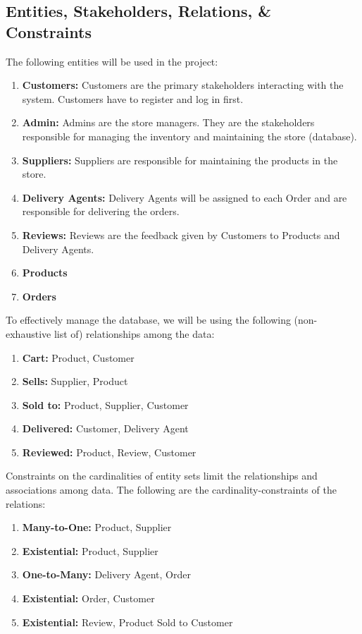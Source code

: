 \documentclass[12pt]{report}
\begin{document}
    \subsection*{Entities, Stakeholders, Relations, \& Constraints}
    The following entities will be used in the project:
    \begin{enumerate}
        \item \textbf{Customers:}
        Customers are the primary stakeholders interacting with the system.
        Customers have to register and log in first.
        \item \textbf{Admin:}
        Admins are the store managers.
        They are the stakeholders responsible for managing the inventory and maintaining the store (database).
        \item \textbf{Suppliers:}
        Suppliers are responsible for maintaining the products in the store.
        \item \textbf{Delivery Agents:}
        Delivery Agents will be assigned to each Order and are responsible for delivering the orders.
        \item \textbf{Reviews:}
        Reviews are the feedback given by Customers to Products and Delivery Agents.
        \item \textbf{Products}
        \item \textbf{Orders}
    \end{enumerate}
    To effectively manage the database, we will be using the following (non-exhaustive list of) relationships among the data:
    \begin{enumerate}
        \item \textbf{Cart:} Product, Customer
        \item \textbf{Sells:} Supplier, Product
        \item \textbf{Sold to:} Product, Supplier, Customer
        \item \textbf{Delivered:} Customer, Delivery Agent
        \item \textbf{Reviewed:} Product, Review, Customer
    \end{enumerate}
    \vspace*{10pt}
    Constraints on the cardinalities of entity sets limit the relationships and associations among data.
    The following are the cardinality-constraints of the relations:
    \begin{enumerate}
        \item \textbf{Many-to-One:} Product, Supplier
        \item \textbf{Existential:} Product, Supplier
        \item \textbf{One-to-Many:} Delivery Agent, Order
        \item \textbf{Existential:} Order, Customer
        \item \textbf{Existential:} Review, Product Sold to Customer
    \end{enumerate}
\end{document}
